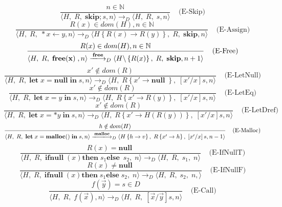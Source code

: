 \documentclass[english]{jssst_ppl} %
\newcommand\LET{\mathbf{let}\;}
\newcommand\FREE{\mathbf{free(x)}\;}
\newcommand\IN{\mathbf{in}\;}
\newcommand\SKIP{\mathbf{skip}}
\newcommand\Rtab{\; \; \; \;}
\newcommand\NULL{\mathbf{null}\;}
\newcommand\IFNULL{\mathbf{ifnull}\;}
\newcommand\THEN{\mathbf{then}\;}
\newcommand\ELSE{\mathbf{else}\;}
\newcommand\Lfc{\left\{}
\newcommand\Rfc{\right\}}
\newcommand\Lb{\left[}
\newcommand\Rb{\right]}
\newcommand\coma{,\;}
\newcommand\Malloc{\mathbf{malloc}}
\newcommand\Free{\mathbf{free}}
\newcommand\Cirx{(x)}
\theoremstyle{definition}
\begin{document}
$$
    \frac{n \in \mathbb{N}}
            {\langle H\coma R\coma  \SKIP;s , n \rangle
              \longrightarrow_{D}
                \langle H\coma R\coma   s , n \rangle }
     \Rtab \mbox{(E-Skip)}
$$
$$
     \frac{R(x) \in dom(H), n \in \mathbb{N}}
           {\langle H\coma R\coma  *x \leftarrow y , n \rangle
             \longrightarrow_{D}
             \langle H \Lfc R(x) \rightarrow R(y) \Rfc \coma R \coma   \SKIP , n  \rangle }
     \Rtab \mbox{(E-Assign)}
$$
$$
     \frac{R(x) \in dom(H) , n \in \mathbb{N}}
          {\langle H\coma R\coma  \FREE , n \rangle
            \xlongrightarrow{\Free}_{D}
            \langle H\backslash \Lfc R(x) \Rfc \coma R \coma   \SKIP , n+1  \rangle }
     \Rtab \mbox{(E-Free)}
$$
$$
     \frac{x' \notin dom(R)}
           {\langle H\coma R\coma  \LET x = \NULL \IN s , n \rangle
             \longrightarrow_{D}
             \langle H\coma R\Lfc x' \rightarrow \NULL \Rfc \coma   \Lb x'/x \Rb s , n  \rangle }
     \Rtab \mbox{(E-LetNull)}
$$
$$
     \frac{x' \notin dom(R)}
            {\langle H\coma R\coma \LET x = y \; \IN s , n \rangle
              \longrightarrow_{D}
              \langle H\coma R\Lfc x' \rightarrow R(y) \Rfc \coma   \Lb x'/x \Rb s , n  \rangle }
\Rtab \mbox{(E-LetEq)}
$$
$$
     \frac{x' \notin dom(R)}
            {\langle H\coma R\coma  \LET x = *y \; \IN s , n \rangle
              \longrightarrow_{D}
              \langle H\coma R\Lfc x' \rightarrow H(R(y)) \Rfc \coma   \Lb x'/x \Rb s , n  \rangle }
     \Rtab \mbox{(E-LetDref)}
$$
$$
     \frac{h \notin dom(H)}
            {\langle H\coma R\coma  \LET x = \Malloc() \; \IN s , n \rangle
              \xlongrightarrow{\Malloc}_{D}
              \langle H \Lfc h \rightarrow v\Rfc \coma R\Lfc x' \rightarrow h \Rfc \coma   \Lb x'/x \Rb s , n-1  \rangle }
\Rtab \mbox{(E-Malloc)}
$$
$$
    \frac{R(x) = \NULL}
           {\langle H \coma R \coma \IFNULL\Cirx   \THEN   s_{1} \ELSE\  s_{2} \coma  n \rangle
           \longrightarrow_{D}
           \langle H\coma R\coma s_{1} \coma n \rangle}
    \Rtab \mbox{(E-IfNullT)}
$$
$$
    \frac{R(x) \neq \NULL}
           {\langle H \coma R \coma \IFNULL\Cirx \THEN  s_{1} \ELSE  s_{2} \coma  n \rangle
           \longrightarrow_{D}
           \langle H\coma R\coma s_{2} \coma  n, \rangle}
    \Rtab \mbox{(E-IfNullF)}
$$
$$
     \frac{f(\vec{y}) = s \in D}
            { \langle H\coma R\coma  f(\vec{x}) , n \rangle
               \longrightarrow_{D}
               \langle H\coma R\coma  \Lb \vec{x}/\vec{y} \Rb s , n \rangle}
      \Rtab \mbox{(E-Call)}
$$
\end{document}
